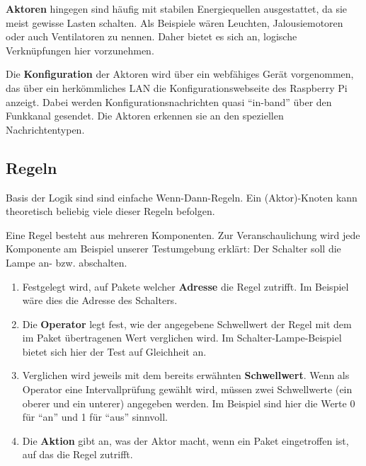 \documentclass{IEEEtran}
\begin{document}
        \textbf{Aktoren} hingegen sind häufig mit stabilen Energiequellen
        ausgestattet, da sie meist gewisse Lasten schalten.
        Als Beispiele wären Leuchten, Jalousiemotoren oder auch Ventilatoren
        zu nennen.
        Daher bietet es sich an, logische Verknüpfungen hier vorzunehmen.

        Die \textbf{Konfiguration} der Aktoren wird über ein webfähiges Gerät
        vorgenommen, das über ein herkömmliches \ac{LAN} die
        Konfigurationswebseite des Raspberry Pi anzeigt.
        Dabei werden Konfigurationsnachrichten quasi \enquote{in-band}
        über den Funkkanal gesendet.
        Die Aktoren erkennen sie an den speziellen Nachrichtentypen.

    \subsection{Regeln}
        Basis der Logik sind sind einfache Wenn-Dann-Regeln.
        Ein (Aktor)-Knoten kann theoretisch beliebig viele dieser Regeln befolgen.

        Eine Regel besteht aus mehreren Komponenten.
        Zur Veranschaulichung wird jede Komponente am Beispiel unserer
        Testumgebung erklärt: Der Schalter soll die Lampe an- bzw. abschalten.
        \begin{enumerate}
            \item Festgelegt wird, auf Pakete welcher \textbf{Adresse}
                die Regel zutrifft.
                Im Beispiel wäre dies die Adresse des Schalters.
            \item Die \textbf{Operator} legt fest, wie der angegebene
                Schwellwert der Regel mit dem im Paket übertragenen Wert
                verglichen wird.
                Im Schalter-Lampe-Beispiel bietet sich hier der Test auf Gleichheit an.
            \item Verglichen wird jeweils mit dem bereits erwähnten
                \textbf{Schwellwert}. Wenn als Operator eine Intervallprüfung
                gewählt wird, müssen zwei Schwellwerte
                (ein oberer und ein unterer) angegeben werden.
                Im Beispiel sind hier die Werte 0 für \enquote{an}
                und 1 für \enquote{aus} sinnvoll.
            \item Die \textbf{Aktion} gibt an, was der Aktor macht,
                wenn ein Paket eingetroffen ist, auf das die Regel zutrifft.
        \end{enumerate}
\end{document}
